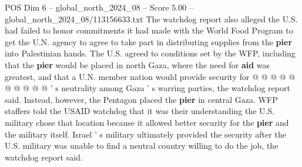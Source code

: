 \begin{textsample}{POS Dim 6 – global\_north\_2024\_08 – Score 5.00 – global\_north\_2024\_08/113156633.txt}
The watchdog report also alleged the U.S. had failed to honor commitments it had made with the World Food Program to get the U.N. agency to agree to take part in distributing supplies from the \textbf{pier} into Palestinian hands.
The U.S. agreed to conditions set by the WFP, including that the \textbf{pier} would be placed in north Gaza, where the need for \textbf{aid} was greatest, and that a U.N. member nation would provide security for @ @ @ @ @ @ @ @ @ @ ' s neutrality among Gaza ' s warring parties, the watchdog report said.
Instead, however, the Pentagon placed the \textbf{pier} in central Gaza.
WFP staffers told the USAID watchdog that it was their understanding the U.S. military chose that location because it allowed better security for the \textbf{pier} and the military itself.
Israel ' s military ultimately provided the security after the U.S. military was unable to find a neutral country willing to do the job, the watchdog report said.

\end{textsample}
